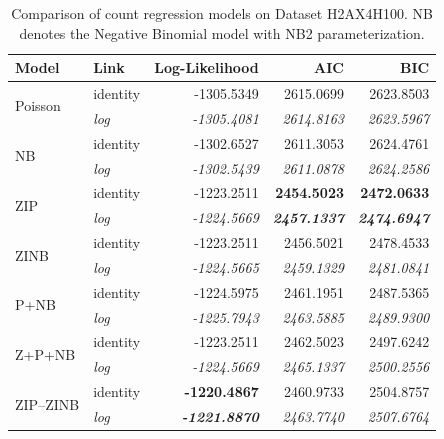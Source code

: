 \begin{table}[!h]
\caption{Comparison of count regression models on Dataset H2AX4H100. NB denotes the Negative Binomial model with NB2 parameterization.}
\centering
\begin{tabular}{llrrr}
\toprule
Model & Link & Log-Likelihood & AIC & BIC \\
\midrule
\multirow[t]{2}{*}{Poisson} & identity & -1305.5349 & 2615.0699 & 2623.8503 \\
 & \textit{log} & \textit{-1305.4081} & \textit{2614.8163} & \textit{2623.5967} \\

\multirow[t]{2}{*}{NB} & identity & -1302.6527 & 2611.3053 & 2624.4761 \\
 & \textit{log} & \textit{-1302.5439} & \textit{2611.0878} & \textit{2624.2586} \\

\multirow[t]{2}{*}{ZIP} & identity & -1223.2511 & \textbf{2454.5023} & \textbf{2472.0633} \\
 & \textit{log} & \textit{-1224.5669} & \textbf{\textit{2457.1337}} & \textbf{\textit{2474.6947}} \\

\multirow[t]{2}{*}{ZINB} & identity & -1223.2511 & 2456.5021 & 2478.4533 \\
 & \textit{log} & \textit{-1224.5665} & \textit{2459.1329} & \textit{2481.0841} \\

\multirow[t]{2}{*}{P+NB} & identity & -1224.5975 & 2461.1951 & 2487.5365 \\
 & \textit{log} & \textit{-1225.7943} & \textit{2463.5885} & \textit{2489.9300} \\

\multirow[t]{2}{*}{Z+P+NB} & identity & -1223.2511 & 2462.5023 & 2497.6242 \\
 & \textit{log} & \textit{-1224.5669} & \textit{2465.1337} & \textit{2500.2556} \\

\multirow[t]{2}{*}{ZIP--ZINB} & identity & \textbf{-1220.4867} & 2460.9733 & 2504.8757 \\
 & \textit{log} & \textbf{\textit{-1221.8870}} & \textit{2463.7740} & \textit{2507.6764} \\

\bottomrule
\end{tabular}
\label{tab:H2AX4H100}
\end{table}
